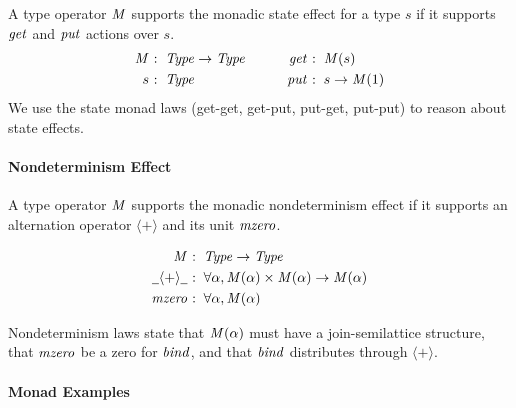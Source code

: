 A type operator $ \operatorname{\mathit{M}} $ supports the monadic state effect for a
type $s$ if it supports $ \operatorname{\mathit{get}} $ and $ \operatorname{\mathit{put}} $ actions over
$s$. \small\begin{alignat*}{4}

   \itop{M}  &  \mathbin{\colon}   \itop{Type}   \rightarrow   \itop{Type}  &  \hspace{1em}   \hspace{1em} \itop{get}  &  \mathbin{\colon}   \itop{M}( s)       \\
  s &  \mathbin{\colon}   \itop{Type}         &  \hspace{1em}   \hspace{1em} \itop{put}  &  \mathbin{\colon}  s  \rightarrow   \itop{M}( 1)

\end{alignat*}\normalsize We use the state monad laws (get-get, get-put,
put-get, put-put) to reason about state effects.

\par

\paragraph{Nondeterminism Effect}

A type operator $ \operatorname{\mathit{M}} $ supports the monadic nondeterminism effect
if it supports an alternation operator $ \mathbin{\langle + \rangle} $
and its unit $ \operatorname{\mathit{mzero}} $.

\small\begin{alignat*}{2}
 \operatorname{\mathit{M}}  &  \mathbin{\colon}   \operatorname{\mathit{Type}}   \rightarrow   \operatorname{\mathit{Type}}  \\
 \underline{\hspace{0.5em}}{  \mathbin{\langle + \rangle}  }\underline{\hspace{0.5em}}  &  \mathbin{\colon}   \forall   \alpha ,  \operatorname{\mathit{M}}(  \alpha )  \times   \operatorname{\mathit{M}}(  \alpha )  \rightarrow   \operatorname{\mathit{M}}(  \alpha ) \\
 \operatorname{\mathit{mzero}}  &  \mathbin{\colon}   \forall   \alpha ,  \operatorname{\mathit{M}}(  \alpha )
\end{alignat*}\normalsize

Nondeterminism laws state that $ \operatorname{\mathit{M}}(  \alpha )$ must have a
join-semilattice structure, that $ \operatorname{\mathit{mzero}} $ be a zero for
$ \operatorname{\mathit{bind}} $, and that $ \operatorname{\mathit{bind}} $ distributes through
$ \mathbin{\langle + \rangle} $.

\par

\paragraph{Monad Examples}

